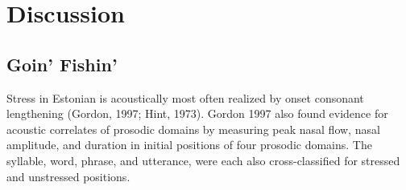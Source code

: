\documentclass[11pt]{article}
\begin{document}
%
%
%
%
%

\section*{Discussion}
\subsection{Goin' Fishin' }

 Stress in Estonian is acoustically most often realized by onset consonant lengthening (Gordon, 1997; Hint, 1973). Gordon 1997 also found evidence for acoustic correlates of prosodic domains by measuring peak nasal flow, nasal amplitude, and duration in initial positions of four prosodic domains. The syllable, word, phrase, and utterance, were each also cross-classified for stressed and unstressed positions. \\
 
\end{document}
